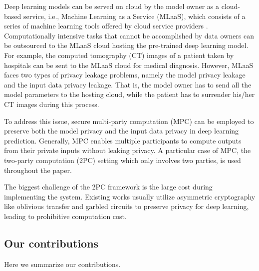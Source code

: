 \documentclass[letterpaper]{article} %
\begin{document}
    Deep learning models can be served on cloud by the model owner as a cloud-based service,
    i.e., Machine Learning as a Service (MLaaS),
    which consists of a series of machine learning tools offered by cloud service providers \cite{ChironCloud}.
    Computationally intensive tasks that cannot be accomplished by data owners can be outsourced to
    the MLaaS cloud hosting the pre-trained deep learning model.
    For example, the computed tomography (CT) images of a patient taken by hospitals
    can be sent to the MLaaS cloud for medical diagnosis.
    However, MLaaS faces two types of privacy leakage problems, namely the model privacy leakage and the
    input data privacy leakage. That is, the model owner has to send all the model parameters to the hosting cloud,
    while the patient has to surrender his/her CT images during this process.

    To address this issue, secure multi-party computation (MPC) can be employed to preserve both the model privacy
    and the input data privacy in deep learning prediction.
    Generally, MPC enables multiple participants
    to compute outputs from their private inputs without leaking privacy.
    A particular case of MPC, the two-party computation (2PC) setting
    which only involves two parties, is used throughout the paper.

    The biggest challenge of the 2PC framework
    is the large cost during implementing the system.
    Existing works usually utilize asymmetric cryptography like oblivious transfer and garbled circuits
    to preserve privacy for deep learning,
    leading to prohibitive computation cost.


    \subsection{Our contributions}%
    Here we summarize our contributions.
\end{document}

